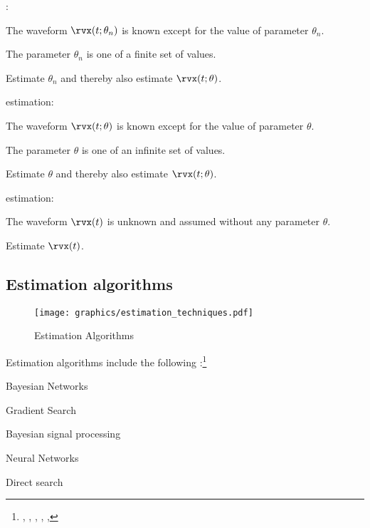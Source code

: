 \begin{enume}
   \item {}:
      \begin{liste}
         \item The waveform $\rvx(t;\theta_n)$ is known except for the value of parameter $\theta_n$.
         \item The parameter $\theta_n$ is one of a finite set of values.
         \item Estimate $\theta_n$ and thereby also estimate $\rvx(t;\theta)$.
      \end{liste}
   \item {} estimation:
      \begin{liste}
         \item The waveform $\rvx(t;\theta)$ is known except for the value of parameter $\theta$.
         \item The parameter $\theta$ is one of an infinite set of values.
         \item Estimate $\theta$ and thereby also estimate $\rvx(t;\theta)$.
      \end{liste}
   \item {} estimation:
      \begin{liste}
         \item The waveform $\rvx(t)$ is unknown and assumed without any parameter $\theta$.
         \item Estimate $\rvx(t)$.
      \end{liste}
\end{enume}


\subsection{Estimation algorithms}
\label{ref:sec:parameter-est}
\begin{figure}
\centering%
\texttt{[image: graphics/estimation\_techniques.pdf]}
\caption{Estimation Algorithms\label{fig:est-tech}}
\end{figure}
Estimation algorithms include the following :\footnote{%
  ,
  ,
  ,
  ,
  ,
  }
\begin{enume}
   \item Bayesian Networks 
   \item Gradient Search
   \item Bayesian signal processing
   \item Neural Networks
   \item Direct search
\end{enume}

